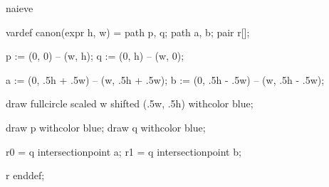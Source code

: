 

\startenvironment naieve

	\startMPdefinitions
		vardef canon(expr h, w) =
			path p, q;
			path a, b;
			pair r[];

			p := (0, 0) -- (w, h);
			q := (0, h) -- (w, 0);

			a := (0, .5h + .5w) -- (w, .5h + .5w); %
			b := (0, .5h - .5w) -- (w, .5h - .5w); %

			draw fullcircle scaled w shifted (.5w, .5h) withcolor blue;

			draw p withcolor blue;
			draw q withcolor blue;

			r0 = q intersectionpoint a; %
			r1 = q intersectionpoint b; %

			r
		enddef;
	\stopMPdefinitions

\stopenvironment

